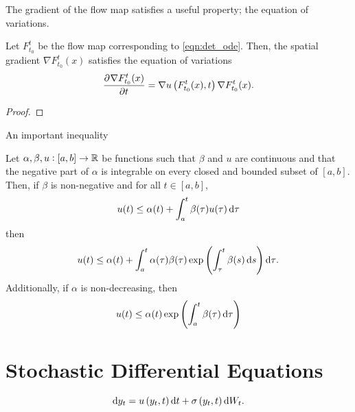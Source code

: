 The gradient of the flow map satisfies a useful property; the equation of variations.
\begin{theorem}
	Let \(F_{t_0}^{t}\) be the flow map corresponding to \eqref{eqn:det_ode}.
	Then, the spatial gradient \(\nabla F_{t_0}^t(x)\) satisfies the equation of variations
	\begin{equation}
		\dpd{\nabla F_{t_0}^{t}(x)}{t} = \nabla u\left(F_{t_0}^t(x), t\right) \nabla F_{t_0}^t(x).
		\label{eqn:eqn_of_variations}
	\end{equation}
\end{theorem}
\begin{proof}

\end{proof}



An important inequality

\begin{theorem}\label{thm:gronwall}
	Let \(\alpha, \beta, u: [a,b] \to \mathbb{R}\) be functions such that \(\beta\) and \(u\) are continuous and that the negative part of \(\alpha\) is integrable on every closed and bounded subset of \([a,b]\). 
	Then, if \(\beta\) is non-negative and for all \(t \in [a,b]\),
	\[
		u(t) \leq \alpha(t) + \int_a^t{\beta(\tau)u(\tau)\dif\tau}
	\]
	then 
	\[
		u(t) \leq \alpha(t) + \int_a^t{\alpha(\tau)\beta(\tau)\exp\left(\int_\tau^{t}{\beta(s)\dif s}\right)\dif\tau}.
	\]
	Additionally, if \(\alpha\) is non-decreasing, then 
	\[
		u(t) \leq \alpha(t) \exp\left(\int_a^t{\beta(\tau)\dif\tau}\right)
	\]
\end{theorem}



\section{Stochastic Differential Equations}


\begin{equation}
	\dif y_t = u\left(y_t, t\right)\dif t + \sigma\left(y_t, t\right)\dif W_t.
	\label{eqn:gen_sde}
\end{equation}

